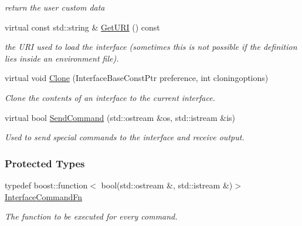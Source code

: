 \begin{DoxyCompactItemize}
\begin{DoxyCompactList}\small\item\em return the user custom data \item\end{DoxyCompactList}\item 
\hypertarget{classOpenRAVE_1_1InterfaceBase_a155ad446997ca5823937f9c171c17021}{
virtual const std::string \& \hyperlink{classOpenRAVE_1_1InterfaceBase_a155ad446997ca5823937f9c171c17021}{GetURI} () const }
\label{classOpenRAVE_1_1InterfaceBase_a155ad446997ca5823937f9c171c17021}

\begin{DoxyCompactList}\small\item\em the URI used to load the interface (sometimes this is not possible if the definition lies inside an environment file). \item\end{DoxyCompactList}\item 
virtual void \hyperlink{classOpenRAVE_1_1InterfaceBase_aadffdb83bc22dcdd5dd50c27d1bb5496}{Clone} (InterfaceBaseConstPtr preference, int cloningoptions)
\begin{DoxyCompactList}\small\item\em Clone the contents of an interface to the current interface. \item\end{DoxyCompactList}\item 
virtual bool \hyperlink{classOpenRAVE_1_1InterfaceBase_a1293cda647f18fe751e66b910af52407}{SendCommand} (std::ostream \&os, std::istream \&is)
\begin{DoxyCompactList}\small\item\em Used to send special commands to the interface and receive output. \item\end{DoxyCompactList}\end{DoxyCompactItemize}
\subsubsection*{Protected Types}
\begin{DoxyCompactItemize}
\item 
typedef boost::function$<$ bool(std::ostream \&, std::istream \&)$>$ \hyperlink{classOpenRAVE_1_1InterfaceBase_af078e9e99c82cbd71d0bfa325438514e}{InterfaceCommandFn}
\begin{DoxyCompactList}\small\item\em The function to be executed for every command. \item\end{DoxyCompactList}\end{DoxyCompactItemize}
